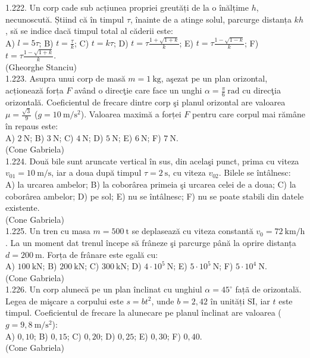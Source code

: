 1.222. Un corp cade sub acțiunea propriei greutăți de la o înălțime $h$, necunoscută. Știind că în timpul $\tau$, înainte de a atinge solul, parcurge distanța $k h$, să se indice dacă timpul total al căderii este:\\ A) $l=5 \tau$; B) $t=\frac{\tau}{k}$; C) $t=k \tau$; D) $t=\tau \frac{1+\sqrt{1+k}}{k}$; E) $t=\tau \frac{1-\sqrt{1-k}}{k}$; F) $t=\tau \frac{1-\sqrt{1+k}}{k}$.\\ (Gheorghe Stanciu)\\

1.223. Asupra unui corp de masă $m=1 \mathrm{~kg}$, aşezat pe un plan orizontal, acționează forța $F$ având o direcţie care face un unghi $\alpha=\frac{\pi}{6} \mathrm{~rad}$ cu direcţia orizontală. Coeficientul de frecare dintre corp şi planul orizontal are valoarea $\mu=\frac{\sqrt{3}}{9}$ ($g=10 \mathrm{~m} / \mathrm{s}^{2}$). Valoarea maximă a forței $F$ pentru care corpul mai rămâne în repaus este:\\ A) $2 \mathrm{~N}$; B) $3 \mathrm{~N}$; C) $4 \mathrm{~N}$; D) $5 \mathrm{~N}$; E) $6 \mathrm{~N}$; F) $7 \mathrm{~N}$.\\ (Cone Gabriela)\\

1.224. Două bile sunt aruncate vertical în sus, din acelaşi punct, prima cu viteza $v_{01}=10 \mathrm{~m} / \mathrm{s}$, iar a doua după timpul $\tau=2 \mathrm{~s}$, cu viteza $v_{02}$. Bilele se întâlnesc:\\ A) la urcarea ambelor; B) la coborârea primeia şi urcarea celei de a doua; C) la coborârea ambelor; D) pe sol; E) nu se întâlnesc; F) nu se poate stabili din datele existente.\\ (Cone Gabriela)\\

1.225. Un tren cu masa $m=500 \mathrm{~t}$ se deplasează cu viteza constantă $v_{0}=72 \mathrm{~km} / \mathrm{h}$. La un moment dat trenul începe să frâneze şi parcurge până la oprire distanța $d=200 \mathrm{~m}$. Forța de frânare este egală cu:\\ A) $100 \mathrm{~kN}$; B) $200 \mathrm{~kN}$; C) $300 \mathrm{~kN}$; D) $4 \cdot 10^{5} \mathrm{~N}$; E) $5 \cdot 10^{5} \mathrm{~N}$; F) $5 \cdot 10^{4} \mathrm{~N}$.\\ (Cone Gabriela)\\

1.226. Un corp alunecă pe un plan înclinat cu unghiul $\alpha=45^{\circ}$ fațã de orizontală. Legea de mişcare a corpului este $s=b t^{2}$, unde $b=2,42$ în unități SI, iar $t$ este timpul. Coeficientul de frecare la alunecare pe planul înclinat are valoarea ($g=9,8 \mathrm{~m} / \mathrm{s}^{2}$):\\ A) $0,10$; B) $0,15$; C) $0,20$; D) $0,25$; E) $0,30$; F) $0,40$.\\ (Cone Gabriela)\\


